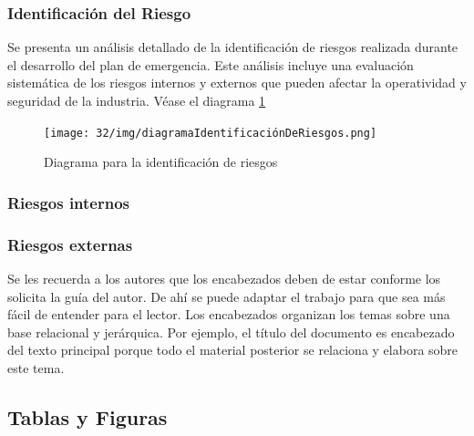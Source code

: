     \subsubsection{Identificación del Riesgo}
    Se presenta un análisis detallado de la identificación de riesgos realizada durante el desarrollo del plan de emergencia. Este análisis incluye una evaluación sistemática de los riesgos internos y externos que pueden afectar la operatividad y seguridad de la industria. Véase el diagrama  \ref{fig:identificacion-riesgos}

    \begin{figure}[H]
        \centering
        \texttt{[image: 32/img/diagramaIdentificaciónDeRiesgos.png]}
        \caption{Diagrama para la identificación de riesgos}
        \label{fig:identificacion-riesgos}
    \end{figure}
    \subsubsection{Riesgos internos}
    \subsubsection{Riesgos externas}
    
    Se les recuerda a los autores que los encabezados deben de estar conforme los solicita la guía del autor. De ahí se puede adaptar el trabajo para que sea más fácil de entender para el lector.
    Los encabezados organizan los temas sobre una base relacional y jerárquica. Por ejemplo, el título del documento es encabezado del texto principal porque todo el material posterior se relaciona y elabora sobre este tema. 
    
    \subsection{Tablas y Figuras}

    \newpage
    \label{anexo:evidenciaEnsamble.pdf}
    
